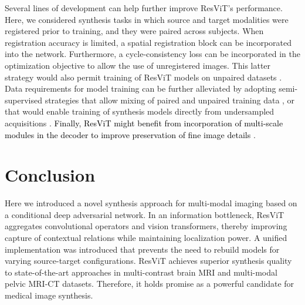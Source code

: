 \documentclass[journal,twoside,web]{ieeecolor}
\newcommand*{\revhl}{\textcolor{black}}
\begin{document}
\par
Several lines of development can help further improve ResViT's performance. Here, we considered synthesis tasks in which source and target modalities were registered prior to training, and they were paired across subjects. When registration accuracy is limited, a spatial registration block can be incorporated into the network. Furthermore, a cycle-consistency loss \cite{cyclegan} can be incorporated in the optimization objective to allow the use of unregistered images. This latter strategy would also permit training of ResViT models on unpaired datasets \cite{woltering2017,ge2019}. Data requirements for model training can be further alleviated by adopting semi-supervised strategies that allow mixing of paired and unpaired training data \cite{jin2018}, or that would enable training of synthesis models directly from undersampled acquisitions \cite{yurt2021ss}. \revhl{Finally, ResViT might benefit from incorporation of multi-scale modules in the decoder to improve preservation of fine image details \cite{Shen2}}.

\vspace{-0.5ex}
\section{Conclusion}
Here we introduced a novel synthesis approach for multi-modal imaging based on a conditional deep adversarial network. In an information bottleneck, ResViT aggregates convolutional operators and vision transformers, thereby improving capture of contextual relations while maintaining localization power. A unified implementation was introduced that prevents the need to rebuild models for varying source-target configurations. ResViT achieves superior synthesis quality to state-of-the-art approaches in multi-contrast brain MRI and multi-modal pelvic MRI-CT datasets. Therefore, it holds promise as a powerful candidate for medical image synthesis.  

\vspace{-0.5ex}
 
\end{document}
